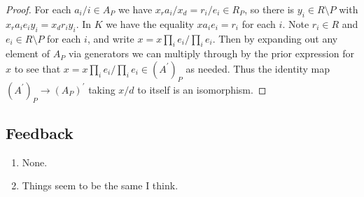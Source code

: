 \documentclass[11pt]{article}
\begin{document}
\begin{enumerate}
\begin{enumerate}
\begin{proof}
        For each $a_i/i\in A_P$ we have $x_ra_i/x_d=r_i/e_i\in R_P$, so there is $y_i\in R\setminus P$ with $x_ra_ie_iy_i = x_dr_iy_i$. In $K$ we have the equality $xa_ie_i = r_i$ for each $i$. Note $r_i\in R$ and $e_i\in R\setminus P$ for each $i$, and write $x= x\prod_ie_i/\prod_ie_i$. Then by expanding out any element of $A_P$ via generators we can multiply through by the prior expression for $x$ to see that $x= x\prod_ie_i/\prod_ie_i\in (A^\prime)_P$ as needed. Thus the identity map $(A^\prime)_P\to (A_P)^\prime$ taking $x/d$ to itself is an isomorphism.
        \end{proof}
    \end{enumerate}
\end{enumerate}
\subsection*{Feedback}
\begin{enumerate}
    \item None.
    \item Things seem to be the same I think.
\end{enumerate}
\end{document}
